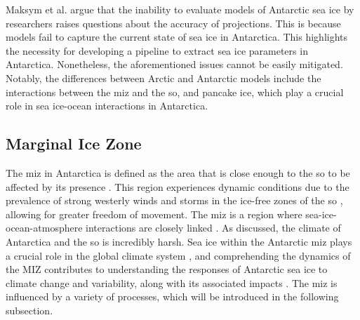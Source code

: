 Maksym et al. \cite{Maksym2012} argue that the inability to evaluate models of Antarctic sea ice by researchers raises questions about the accuracy of projections. This is because models fail to capture the current state of sea ice in Antarctica. This highlights the necessity for developing a pipeline to extract sea ice parameters in Antarctica. Nonetheless, the aforementioned issues cannot be easily mitigated. Notably, the differences between Arctic and Antarctic models include the interactions between the \acs{miz} and the \acs{so}, and pancake ice, which play a crucial role in sea ice-ocean interactions in Antarctica.


\subsection{Marginal Ice Zone} \label{subsec:litReview.antarctica.miz}

The \ac{miz} in Antarctica is defined as the area that is close enough to the \ac{so} to be affected by its presence \cite{Wadhams1986}. This region experiences dynamic conditions due to the prevalence of strong westerly winds and storms in the ice-free zones of the \acs{so} \cite{Massom2010, Brouwer2022, Maksym2012}, allowing for greater freedom of movement. The \acs{miz} is a region where sea-ice-ocean-atmosphere interactions are closely linked \cite{Wadhams1986, Vichi2019}. As discussed, the climate of Antarctica and the \acs{so} is incredibly harsh. Sea ice within the Antarctic \acs{miz} plays a crucial role in the global climate system \cite{Parkinson2004}, and comprehending the dynamics of the MIZ contributes to understanding the responses of Antarctic sea ice to climate change and variability, along with its associated impacts \cite{Brouwer2022}. The \acs{miz} is influenced by a variety of processes, which will be introduced in the following subsection.


